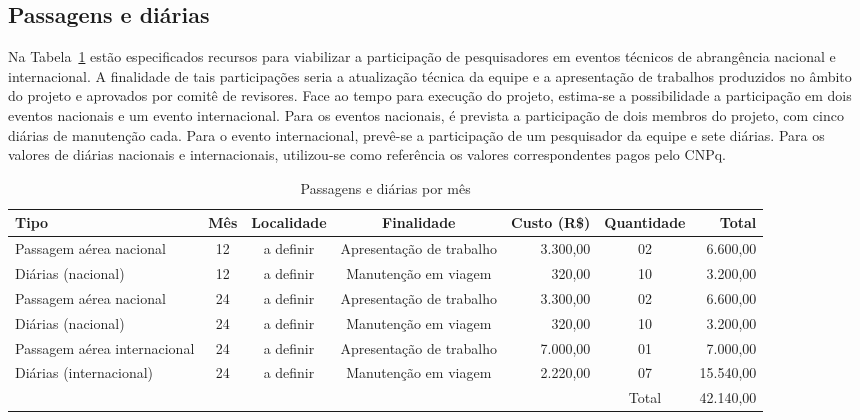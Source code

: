 \subsection{Passagens e diárias}
Na Tabela~\ref{tab:viagem} estão especificados recursos para viabilizar a participação de pesquisadores em eventos técnicos de abrangência nacional e internacional. A finalidade de tais participações seria a atualização técnica da equipe e a apresentação de trabalhos produzidos no âmbito do projeto e aprovados por comitê de revisores. Face ao tempo para execução do projeto, estima-se a possibilidade a participação em dois eventos nacionais e um evento internacional. Para os eventos nacionais, é prevista a participação de dois membros do projeto, com cinco diárias de manutenção cada. Para o evento internacional, prevê-se a participação de um pesquisador da equipe e sete diárias. Para os valores de diárias nacionais e internacionais, utilizou-se como referência os valores correspondentes pagos pelo CNPq.
\begin{table}[!h]
\centering
	\caption{Passagens e diárias por mês}
\begin{tabular}{lcccrcr}
\toprule
	Tipo                         & Mês & Localidade & Finalidade               & Custo (R\$) & Quantidade & Total    \\
	\midrule
	Passagem aérea nacional      & 12  & a definir  & Apresentação de trabalho & 3.300,00    & 02         &  6.600,00 \\
	Diárias (nacional)           & 12  & a definir  & Manutenção em viagem     &   320,00    & 10         &  3.200,00 \\
	Passagem aérea nacional      & 24  & a definir  & Apresentação de trabalho & 3.300,00    & 02         &  6.600,00 \\
	Diárias (nacional)           & 24  & a definir  & Manutenção em viagem     &   320,00    & 10         &  3.200,00 \\
	Passagem aérea internacional & 24  & a definir  & Apresentação de trabalho & 7.000,00    & 01         &  7.000,00 \\
	Diárias (internacional)      & 24  & a definir  & Manutenção em viagem     & 2.220,00    & 07         & 15.540,00 \\
\midrule
	                             &     &            &                          &             & Total      & 42.140,00 \\
\bottomrule
\end{tabular}
	\label{tab:viagem}
\end{table}
 
